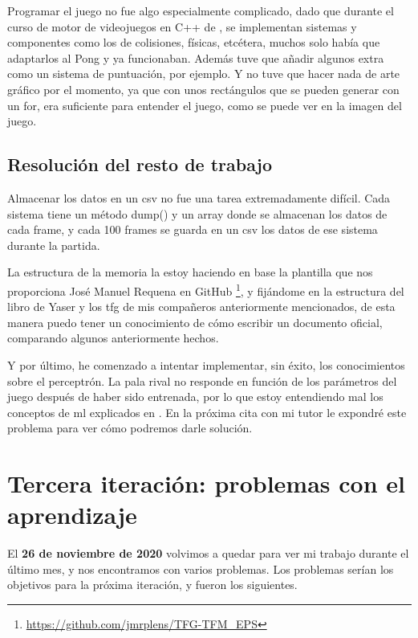 Programar el juego no fue algo especialmente complicado, dado que durante el curso de motor de videojuegos en C++ de , se implementan sistemas y componentes como los de colisiones, físicas, etcétera, muchos solo había que adaptarlos al Pong y ya funcionaban. Además tuve que añadir algunos extra como un sistema de puntuación, por ejemplo. Y no tuve que hacer nada de arte gráfico por el momento, ya que con unos rectángulos que se pueden generar con un for, era suficiente para entender el juego, como se puede ver en la imagen del juego.

\subsection{Resolución del resto de trabajo}
Almacenar los datos en un \gls{csv} no fue una tarea extremadamente difícil. Cada sistema tiene un método dump() y un array donde se almacenan los datos de cada frame, y cada 100 frames se guarda en un \gls{csv} los datos de ese sistema durante la partida.

La estructura de la memoria la estoy haciendo en base la plantilla que nos proporciona José Manuel Requena en GitHub \footnote{\url{https://github.com/jmrplens/TFG-TFM\_EPS}}, y fijándome en la estructura del libro de Yaser y los \gls{tfg} de mis compañeros anteriormente mencionados, de esta manera puedo tener un conocimiento de cómo escribir un documento oficial, comparando algunos anteriormente hechos.

Y por último, he comenzado a intentar implementar, sin éxito, los conocimientos sobre el perceptrón. La pala rival no responde en función de los parámetros del juego después de haber sido entrenada, por lo que estoy entendiendo mal los conceptos de \gls{ml} explicados en \citep{LearningFromData}. En la próxima cita con mi tutor le expondré este problema para ver cómo podremos darle solución.

\section{Tercera iteración: problemas con el aprendizaje}
El \textbf{26 de noviembre de 2020} volvimos a quedar para ver mi trabajo durante el último mes, y nos encontramos con varios problemas. Los problemas serían los objetivos para la próxima iteración, y fueron los siguientes.

